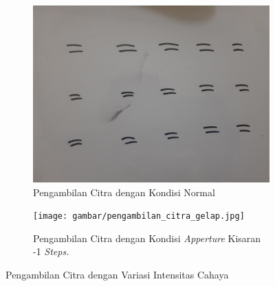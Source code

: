 \begin{figure}[H]
  \begin{subfigure}{.5\textwidth}
    \centering
    \captionsetup{width=.8\linewidth}
    \includegraphics[width=.85\linewidth]{gambar/pengambilan_citra_terang.jpg}
    \caption{Pengambilan Citra dengan Kondisi Normal}
    \label{fig:citraterang}
  \end{subfigure}%
  \begin{subfigure}{.5\textwidth}
    \centering
    \captionsetup{width=.8\linewidth}
    \texttt{[image: gambar/pengambilan\_citra\_gelap.jpg]}
    \caption{Pengambilan Citra dengan Kondisi \textit{Apperture} Kisaran -1 \textit{Steps.}}
    \label{fig:citragelap}
  \end{subfigure}
  \caption{Pengambilan Citra dengan Variasi Intensitas Cahaya}
  \label{fig:intensitascitrabervariasi}
\end{figure}

